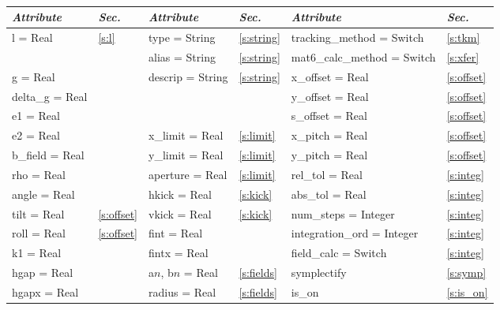 \toffset
\begin{center}
\tt
\begin{tabular}{|l|l||l|l||l|l|} \hline
  {\sl Attribute} & {\sl Sec.}  & {\sl Attribute} & {\sl Sec.} & {\sl Attribute} & {\sl Sec.} \\ \hline
  l        = Real       & \ref{s:l}       & type = String      & \ref{s:string} & tracking\_method = Switch   & \ref{s:tkm}    \\ \hline
                        &                 & alias = String     & \ref{s:string} & mat6\_calc\_method = Switch & \ref{s:xfer}   \\ \hline
  g        = Real       &                 & descrip = String   & \ref{s:string} & x\_offset  = Real           & \ref{s:offset} \\ \hline
  delta\_g = Real       &                 &                    &                & y\_offset  = Real           & \ref{s:offset} \\ \hline
  e1       = Real       &                 &                    &                & s\_offset  = Real           & \ref{s:offset} \\ \hline
  e2       = Real       &                 & x\_limit = Real    & \ref{s:limit}  & x\_pitch = Real             & \ref{s:offset} \\ \hline
  b\_field = Real       &                 & y\_limit = Real    & \ref{s:limit}  & y\_pitch = Real             & \ref{s:offset} \\ \hline
  rho      = Real       &                 & aperture = Real    & \ref{s:limit}  & rel\_tol = Real             & \ref{s:integ}  \\ \hline
  angle    = Real       &                 & hkick    = Real    & \ref{s:kick}   & abs\_tol = Real             & \ref{s:integ}  \\ \hline
  tilt     = Real       & \ref{s:offset}  & vkick    = Real    & \ref{s:kick}   & num\_steps = Integer        & \ref{s:integ}  \\ \hline
  roll     = Real       & \ref{s:offset}  & fint     = Real    &                & integration\_ord = Integer  & \ref{s:integ}  \\ \hline
  k1       = Real       &                 & fintx    = Real    &                & field\_calc = Switch        & \ref{s:integ}  \\ \hline
  hgap     = Real       &                 & a$n$, b$n$ = Real  & \ref{s:fields} & symplectify                 & \ref{s:symp}   \\ \hline
  hgapx    = Real       &                 & radius = Real      & \ref{s:fields} & is\_on                      & \ref{s:is_on}  \\ \hline
\end{tabular}
\end{center}
\toffset

